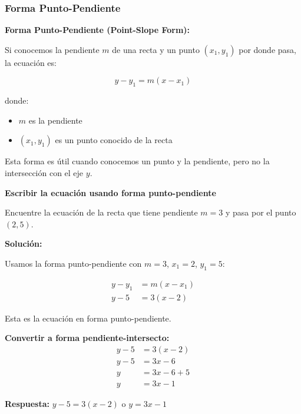 \newpage

\subsubsection*{Forma Punto-Pendiente}

\begin{definition}
\textbf{Forma Punto-Pendiente (Point-Slope Form):}

Si conocemos la pendiente $m$ de una recta y un punto $(x_1, y_1)$ por donde pasa, la ecuación es:

$$\boxed{y - y_1 = m(x - x_1)}$$

donde:
\begin{itemize}
    \item $m$ es la pendiente
    \item $(x_1, y_1)$ es un punto conocido de la recta
\end{itemize}

Esta forma es útil cuando conocemos un punto y la pendiente, pero no la intersección con el eje $y$.
\end{definition}

\begin{example}
\textbf{Escribir la ecuación usando forma punto-pendiente}

Encuentre la ecuación de la recta que tiene pendiente $m = 3$ y pasa por el punto $(2, 5)$.

\textbf{Solución:}

Usamos la forma punto-pendiente con $m = 3$, $x_1 = 2$, $y_1 = 5$:

\begin{align*}
y - y_1 &= m(x - x_1) \\
y - 5 &= 3(x - 2)
\end{align*}

Esta es la ecuación en forma punto-pendiente.

\textbf{Convertir a forma pendiente-intersecto:}
\begin{align*}
y - 5 &= 3(x - 2) \\
y - 5 &= 3x - 6 \\
y &= 3x - 6 + 5 \\
y &= 3x - 1
\end{align*}

\textbf{Respuesta:} $y - 5 = 3(x - 2)$ o $y = 3x - 1$
\end{example}

